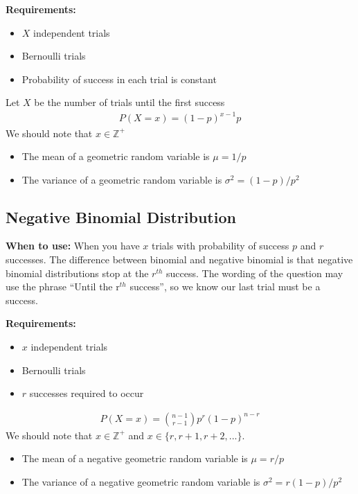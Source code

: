 \documentclass[12pt, titlepage, oneside]{article}
\renewcommand{\b}[1]{\textbf{#1}}
\begin{document}
    \b{Requirements:}
    \begin{itemize}
      \item $X$ independent trials
      \item Bernoulli trials
      \item Probability of success in each trial is constant
    \end{itemize}

    Let $X$ be the number of trials until the first success
    \begin{align}
      P(X = x) = (1-p)^{x-1}p
    \end{align}
    We should note that $x \in \mathbb{Z}^+$
    \begin{itemize}
      \item The mean of a geometric random variable is $\mu = 1/p$
      \item The variance of a geometric random variable is $\sigma^2 = (1-p)/p^2$
    \end{itemize}

    \subsection{Negative Binomial Distribution}
    \b{When to use:} When you have $x$ trials with probability of success $p$ and $r$ successes. The difference between binomial and negative binomial is that negative binomial distributions stop at the $r^{th}$ success. The wording of the question may use the phrase ``Until the r$^{th}$ success'', so we know our last trial must be a success.

    \b{Requirements: }
    \begin{itemize}
      \item $x$ independent trials
      \item Bernoulli trials
      \item $r$ successes required to occur
      \end{itemize}
    \begin{align}
      P(X = x) = { n - 1 \choose r - 1} p^{r}(1-p)^{n-r}
      \end{align}
      We should note that $x \in \mathbb{Z}^+$ and $x \in \{ r, r + 1, r + 2, ...\}$.
      \begin{itemize}
        \item The mean of a negative geometric random variable is $\mu = r/p$
        \item The variance of a negative geometric random variable is $\sigma^2 = r(1-p)/p^2$
      \end{itemize}
\end{document}
